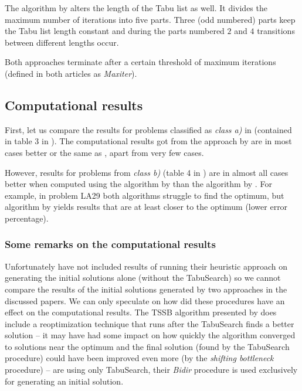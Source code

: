 \documentclass[14pt]{article}
\begin{document}
The algorithm by \citet{pezzella} alters the length of the Tabu list as well. It divides the maximum number of iterations into five parts. Three (odd numbered) parts keep the Tabu list length constant and during the parts numbered $2$ and $4$ transitions between different lengths occur.

Both approaches terminate after a certain threshold of maximum iterations (defined in both articles as \textit{Maxiter}).

\subsection{Computational results}

First, let us compare the results for problems classified as \textit{class a)} in \cite{pezzella} (contained in table 3 in \cite{amico-trubian}). The computational results got from the approach by \citet{pezzella} are in most cases better or the same as \citet{amico-trubian}, apart from very few cases.

However, results for problems from \textit{class b)} (table 4 in \cite{amico-trubian}) are in almost all cases better when computed using the algorithm by \citet{pezzella} than the algorithm by \citet{amico-trubian}. For example, in problem LA29 both algorithms struggle to find the optimum, but algorithm by \citet{pezzella} yields results that are at least closer to the optimum (lower error percentage).

\subsubsection{Some remarks on the computational results}

Unfortunately \citet{pezzella} have not included results of running their heuristic approach on generating the initial solutions alone (without the TabuSearch) so we cannot compare the results of the initial solutions generated by two approaches in the discussed papers. We can only speculate on how did these procedures have an effect on the computational results. The TSSB algorithm presented by \citet{pezzella} does include a reoptimization technique that runs after the TabuSearch finds a better solution – it may have had some impact on how quickly the algorithm converged to solutions near the optimum and the final solution (found by the TabuSearch procedure) could have been improved even more (by the \textit{shifting bottleneck} procedure) – \citet{amico-trubian} are using only TabuSearch, their \textit{Bidir} procedure is used exclusively for generating an initial solution.
\end{document}

